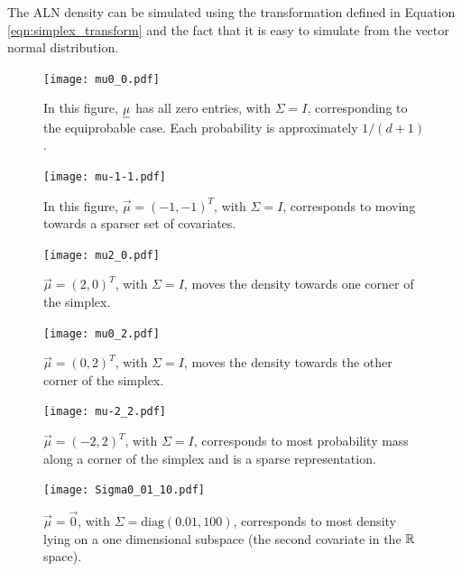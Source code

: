 The ALN density can be simulated using the transformation defined in Equation \ref{eqn:simplex_transform} and the fact that it is easy to simulate from the vector normal distribution. 

\begin{figure}[ht]
\begin{minipage}[b]{0.45\linewidth}
\centering
\texttt{[image: mu0\_0.pdf]}
\caption[ALN plot with a zero mean vector]{In this figure, $\underline{\mu}$ has all zero entries, with $\Sigma=I$, corresponding to the equiprobable case. Each probability is approximately $1/(d+1)$. }
\label{fig:figure9}
\end{minipage}
\hspace{0.5cm}
\begin{minipage}[b]{0.45\linewidth}
\centering
\texttt{[image: mu-1-1.pdf]}
\caption[ALN plot with a negative one mean vector]{In this figure, $\vec{\mu}=(-1,-1)^T$, with $\Sigma=I$, corresponds to moving towards a sparser set of covariates. }
\label{fig:figure10}
\end{minipage}
\end{figure}

\begin{figure}[ht]
\begin{minipage}[b]{0.45\linewidth}
\centering
\texttt{[image: mu2\_0.pdf]}
\caption[ALN plot with a mean vector $(2,0)^{T}$]{$\vec{\mu}=(2,0)^T$, with $\Sigma=I$, moves the density towards one corner of the simplex. }
\label{fig:figure1}
\end{minipage}
\hspace{0.5cm}
\begin{minipage}[b]{0.45\linewidth}
\centering
\texttt{[image: mu0\_2.pdf]}
\caption[ALN plot with mean vector $(2,0)^{T}$]{$\vec{\mu}=(0,2)^T$, with $\Sigma=I$, moves the density towards the other corner of the simplex. }
\label{fig:figur2}
\end{minipage}
\end{figure}

\begin{figure}[ht]
\begin{minipage}[b]{0.45\linewidth}
\centering
\texttt{[image: mu-2\_2.pdf]}
\caption[ALN plot with a mean vector of $(-2,2)^{T}$]{$\vec{\mu}=(-2,2)^T$, with $\Sigma=I$, corresponds to most probability mass along a corner of the simplex and is a sparse representation.} 
\label{fig:figure3}
\end{minipage}
\hspace{0.5cm}
\begin{minipage}[b]{0.45\linewidth}
\centering
\texttt{[image: Sigma0\_01\_10.pdf]}
\caption[ALN plot $\Sigma=\text{Diag(0.01,100)}$]{ $\vec{\mu}=\vec{0}$, with
 $\Sigma= \text{diag}(0.01, 100)$, corresponds to most density lying on a one dimensional subspace (the second covariate in the $\mathbb{R}^{\ }$ space).  }
\label{fig:figure4}
\end{minipage}
\end{figure}


